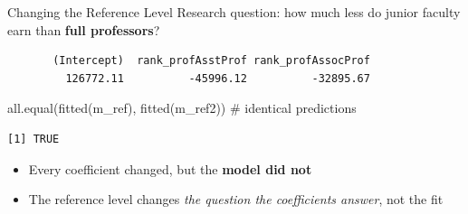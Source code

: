 \documentclass[
  ignorenonframetext,
  aspectratio=169,
]{beamer}
\newenvironment{Shaded}{\begin{snugshade}}{\end{snugshade}}
\newcommand{\AttributeTok}[1]{\textcolor[rgb]{0.40,0.45,0.13}{#1}}
\newcommand{\CommentTok}[1]{\textcolor[rgb]{0.37,0.37,0.37}{#1}}
\newcommand{\FunctionTok}[1]{\textcolor[rgb]{0.28,0.35,0.67}{#1}}
\newcommand{\NormalTok}[1]{\textcolor[rgb]{0.00,0.23,0.31}{#1}}
\newcommand{\OtherTok}[1]{\textcolor[rgb]{0.00,0.23,0.31}{#1}}
\newcommand{\SpecialCharTok}[1]{\textcolor[rgb]{0.37,0.37,0.37}{#1}}
\newcommand{\StringTok}[1]{\textcolor[rgb]{0.13,0.47,0.30}{#1}}
\providecommand{\tightlist}{%
  \setlength{\itemsep}{0pt}\setlength{\parskip}{0pt}}\usepackage{longtable,booktabs,array}
\begin{document}
\begin{frame}[fragile]{Changing the Reference Level}
\protect\hypertarget{changing-the-reference-level}{}
Research question: how much less do junior faculty earn than
\textbf{full professors}?

\begin{Shaded}
\end{Shaded}

\begin{verbatim}
       (Intercept)  rank_profAsstProf rank_profAssocProf 
         126772.11          -45996.12          -32895.67 
\end{verbatim}

\begin{Shaded}
\begin{Highlighting}[]
\FunctionTok{all.equal}\NormalTok{(}\FunctionTok{fitted}\NormalTok{(m\_ref), }\FunctionTok{fitted}\NormalTok{(m\_ref2))   }\CommentTok{\# identical predictions}
\end{Highlighting}
\end{Shaded}

\begin{verbatim}
[1] TRUE
\end{verbatim}

\begin{itemize}
\tightlist
\item
  Every coefficient changed, but the \textbf{model did not}
\item
  The reference level changes \emph{the question the coefficients
  answer}, not the fit
\end{itemize}
\end{frame}
\end{document}
